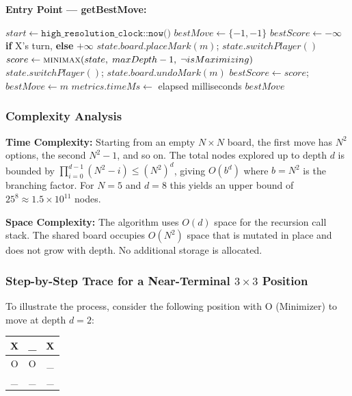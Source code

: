 \documentclass[conference]{IEEEtran}
\begin{document}
\textbf{Entry Point --- getBestMove:}

\begin{algorithm}[htbp]
\caption{Entry Point: getBestMove}
\begin{algorithmic}[1]
    \State $start \gets \texttt{high\_resolution\_clock::now()}$
    \State $bestMove \gets \{-1,-1\}$
    \State $bestScore \gets -\infty$ \textbf{ if } X's turn, \textbf{ else } $+\infty$
        \State $state.board.placeMark(m)$; \quad $state.switchPlayer()$
        \State $score \gets \Call{minimax}{state,\; maxDepth - 1,\; \neg isMaximizing}$
        \State $state.switchPlayer()$; \quad $state.board.undoMark(m)$
            \State $bestScore \gets score$; \quad $bestMove \gets m$
        \EndIf
    \EndFor
    \State $metrics.timeMs \gets$ elapsed milliseconds
    \State \Return $bestMove$
\EndProcedure
\end{algorithmic}
\end{algorithm}

\subsubsection{Complexity Analysis}
\textbf{Time Complexity:} Starting from an empty $N \times N$ board, the
first move has $N^2$ options, the second $N^2 - 1$, and so on. The total
nodes explored up to depth $d$ is bounded by
$\prod_{i=0}^{d-1}(N^2 - i) \leq (N^2)^d$, giving $O(b^d)$ where
$b = N^2$ is the branching factor. For $N = 5$ and $d = 8$ this yields
an upper bound of $25^8 \approx 1.5 \times 10^{11}$ nodes.

\textbf{Space Complexity:} The algorithm uses $O(d)$ space for the
recursion call stack. The shared board occupies $O(N^2)$ space that is
mutated in place and does not grow with depth. No additional storage
is allocated.

\subsubsection{Step-by-Step Trace for a Near-Terminal $3 \times 3$ Position}
To illustrate the process, consider the following position with O
(Minimizer) to move at depth $d = 2$:

\begin{center}
\setlength{\tabcolsep}{8pt}
\renewcommand{\arraystretch}{1.3}
\begin{tabular}{c|c|c}
X & \_ & X \\ \hline
O & O & \_ \\ \hline
\_ & \_ & \_ \\
\end{tabular}
\end{center}
\end{document}
